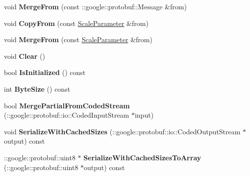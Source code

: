 \begin{DoxyCompactItemize}
void {\bfseries Merge\+From} (const \+::google\+::protobuf\+::\+Message \&from)
\item 
\mbox{\label{classcaffe_1_1_scale_parameter_a6b4f4731f5f3797d95c583e596e9f783}} 
void {\bfseries Copy\+From} (const \mbox{\hyperlink{classcaffe_1_1_scale_parameter}{Scale\+Parameter}} \&from)
\item 
\mbox{\label{classcaffe_1_1_scale_parameter_a92d46fc8e5cde3edcf1e5a4457078080}} 
void {\bfseries Merge\+From} (const \mbox{\hyperlink{classcaffe_1_1_scale_parameter}{Scale\+Parameter}} \&from)
\item 
\mbox{\label{classcaffe_1_1_scale_parameter_aacc2f0598cee6972468e1ce489724259}} 
void {\bfseries Clear} ()
\item 
\mbox{\label{classcaffe_1_1_scale_parameter_adbef4dfb162b828fcb4f7807090ac639}} 
bool {\bfseries Is\+Initialized} () const
\item 
\mbox{\label{classcaffe_1_1_scale_parameter_a20a525f668dd2ea9d97fc8a18a197139}} 
int {\bfseries Byte\+Size} () const
\item 
\mbox{\label{classcaffe_1_1_scale_parameter_a27c5a7e5c86c2de6a27836ae5db70294}} 
bool {\bfseries Merge\+Partial\+From\+Coded\+Stream} (\+::google\+::protobuf\+::io\+::\+Coded\+Input\+Stream $\ast$input)
\item 
\mbox{\label{classcaffe_1_1_scale_parameter_ad52d47f3aa0f420c9be166da3f815018}} 
void {\bfseries Serialize\+With\+Cached\+Sizes} (\+::google\+::protobuf\+::io\+::\+Coded\+Output\+Stream $\ast$output) const
\item 
\mbox{\label{classcaffe_1_1_scale_parameter_a909d2a4f521909f173f8c82049c1e68e}} 
\+::google\+::protobuf\+::uint8 $\ast$ {\bfseries Serialize\+With\+Cached\+Sizes\+To\+Array} (\+::google\+::protobuf\+::uint8 $\ast$output) const
\item 
\mbox{\label{classcaffe_1_1_scale_parameter_adf0e2b42b3f4386c1dd2f401b89e4ad3}} 

\end{DoxyCompactItemize}

